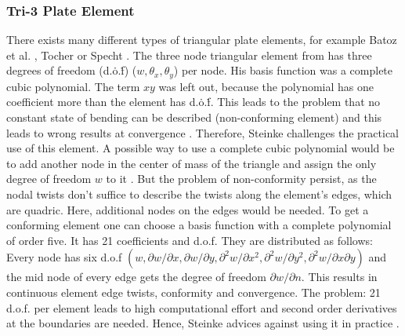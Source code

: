   \subsubsection{Tri-3 Plate Element} %
  There exists many different types of triangular plate elements, for example Batoz et al. \cite{batoz1980study}, Tocher \cite{tocher1963analysis} or Specht \cite{specht1988modified}. The three node triangular element from \cite{tocher1963analysis} has three degrees of freedom (d.\.o.\.f) ($w, \theta_x, \theta_y$) per node. His basis function was a complete cubic polynomial. The term $xy$ was left out, because the polynomial has one coefficient more than the element has d.\.o.\.f. This leads to the problem that no constant state of bending can be described (non-conforming element) and this leads to wrong results at convergence \cite{steinke2005finite}. Therefore, Steinke challenges the practical use of this element.
  A possible way to use a complete cubic polynomial would be to add another node in the center of mass of the triangle and assign the only degree of freedom $w$ to it \cite{steinke2005finite}. But the problem of non-conformity persist, as the nodal twists don't suffice to describe the twists along the element's edges, which are quadric. Here, additional nodes on the edges would be needed.
  To get a conforming element one can choose a basis function with a complete polynomial of order five. It has 21 coefficients and d.o.f. They are distributed as follows: Every node has six d.o.f $(w, \partial w/\partial x, \partial w/\partial y, \partial^2 w/\partial x^2, \partial^2 w/\partial y^2, \partial^2 w/\partial x\partial y)$ and the mid node of every edge gets the degree of freedom $\partial w/\partial n$. This results in continuous element edge twists, conformity and convergence. The problem: 21 d.o.f. per element leads to high computational effort and second order derivatives at the boundaries are needed. Hence, Steinke advices against using it in practice \cite{steinke2005finite}.
  
